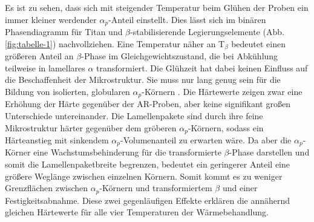 Es ist zu sehen, dass sich mit steigender Temperatur beim Glühen der Proben ein immer kleiner werdender $\alpha_p$-Anteil einstellt. Dies lässt sich im binären Phasendiagramm für Titan und $\beta$-stabilisierende Legierungselemente (Abb. \ref{fig:tabelle-1}) nachvollziehen. Eine Temperatur näher an T$_{\beta}$ bedeutet einen größeren Anteil an $\beta$-Phase im Gleichgewichtszustand, die bei Abkühlung teilweise in lamellares $\alpha$ transformiert. Die Glühzeit hat dabei keinen Einfluss auf die Beschaffenheit der Mikrostruktur. Sie muss nur lang genug sein für die Bildung von isolierten, globularen $\alpha_p$-Körnern \cite{G.LutjeringJ.C.WilliamsA.Gysler.}. 
Die Härtewerte zeigen zwar eine Erhöhung der Härte gegenüber der AR-Proben, aber keine signifikant großen Unterschiede untereinander. Die Lamellenpakete sind durch ihre feine Mikrostruktur härter gegenüber dem gröberen $\alpha_p$-Körnern, sodass ein Härteanstieg mit sinkendem $\alpha_p$-Volumenanteil zu erwarten wäre. Da aber die $\alpha_p$-Körner eine Wachstumsbehinderung für die transformierte $\beta$-Phase darstellen und somit die Lamellenpaketbreite begrenzen, bedeutet ein geringerer Anteil eine größere Weglänge zwischen einzelnen Körnern. Somit kommt es zu weniger Grenzflächen zwischen $\alpha_p$-Körnern und transformiertem $\beta$ und einer Festigkeitsabnahme. Diese zwei gegenläufigen Effekte erklären die annähernd gleichen Härtewerte für alle vier Temperaturen der Wärmebehandlung. 